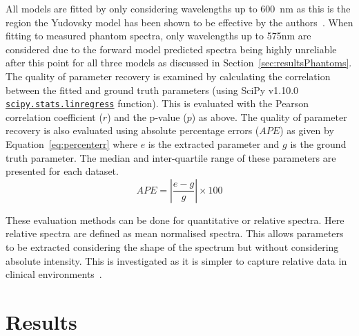 All models are fitted by only considering wavelengths up to 600~nm as this is the region the Yudovsky model has been shown to be effective by the authors~\citep{Yudovsky2011a}.
When fitting to measured phantom spectra, only wavelengths up to 575nm are considered due to the forward model predicted spectra being highly unreliable after this point for all three models as discussed in Section~\ref{sec:resultsPhantoms}. The quality of parameter recovery is examined by calculating the correlation between the fitted and ground truth parameters (using SciPy v1.10.0 \href{https://docs.scipy.org/doc/scipy/reference/generated/scipy.stats.linregress.html}{\texttt{scipy.stats.linregress}} function). This is evaluated with the Pearson correlation coefficient ($r$) and the p-value ($p$) as above. The quality of parameter recovery is also evaluated using absolute percentage errors ($APE$) as given by Equation~\eqref{eq:percenterr} where $e$ is the extracted parameter and $g$ is the ground truth parameter. The median and inter-quartile range of these parameters are presented for each dataset. 
\begin{equation}
    APE = |\frac{e - g}{g}| \times 100 
    \label{eq:percenterr}
\end{equation}

These evaluation methods can be done for quantitative or relative spectra. Here relative spectra are defined as mean normalised spectra. This allows parameters to be extracted considering the shape of the spectrum but without considering absolute intensity. This is investigated as it is simpler to capture relative data in clinical environments~\citep{Bahl2023}.

\section{Results}\label{sec:results}
